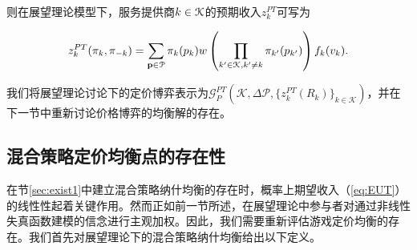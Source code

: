 则在展望理论模型下，服务提供商$ k\in\mathcal{K}$的预期收入$z_k^{PT}$可写为

\begin{equation}\label{eq:PT}
z_{k}^{PT}(\pi_{k},\pi_{-k})=\sum_{\mathbf{p}\in \mathcal{P}}\pi_k(p_k)w\left(\prod_{k'\in\mathcal{K},k'\neq k}\pi_{k'}(p_{k'})\right)f_k(v_k).
\end{equation}

我们将展望理论讨论下的定价博弈表示为$\mathcal{G}_P^{PT}\left(\mathcal{K},\Delta\mathcal{P},\{z_k^{PT}(R_k)\}_{k\in\mathcal{K}}\right)$，并在下一节中重新讨论价格博弈的均衡解的存在。


\subsection{混合策略定价均衡点的存在性}
在节\ref{sec:exist1}中建立混合策略纳什均衡的存在时，概率上期望收入（\ref{eq:EUT}）的线性性起着关键作用。然而正如前一节所述，在展望理论中参与者对通过非线性失真函数建模的信念进行主观加权。因此，我们需要重新评估游戏定价均衡的存在。我们首先对展望理论下的混合策略纳什均衡给出以下定义。

